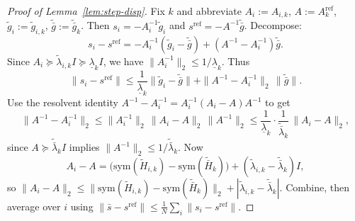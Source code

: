 \documentclass[10pt,twocolumn,letterpaper]{article}
\theoremstyle{compact}
\theoremstyle{compactremark}
\begin{document}
\begin{proof}[Proof of Lemma~\ref{lem:step-disp}]
Fix $k$ and abbreviate $A_i:=A_{i,k}$, $A:=A_k^{\mathrm{ref}}$, $\tilde g_i:=\tilde g_{i,k}$, $\tilde{\bar g}:=\tilde{\bar g}_k$.
Then $s_i=-A_i^{-1}\tilde g_i$ and $s^{\mathrm{ref}}=-A^{-1}\tilde{\bar g}$.
Decompose:
\[
s_i-s^{\mathrm{ref}}
=-A_i^{-1}(\tilde g_i-\tilde{\bar g}) + (A^{-1}-A_i^{-1})\tilde{\bar g}.
\]
Since $A_i\succeq \tilde\lambda_{i,k}I\succeq \underline\lambda_k I$, we have $\|A_i^{-1}\|_2\le 1/\underline\lambda_k$.
Thus
\[
\|s_i-s^{\mathrm{ref}}\|
\le \frac1{\underline\lambda_k}\|\tilde g_i-\tilde{\bar g}\|+\|A^{-1}-A_i^{-1}\|_2\,\|\tilde{\bar g}\|.
\]
Use the resolvent identity $A^{-1}-A_i^{-1}=A_i^{-1}(A_i-A)A^{-1}$ to get
\[
\|A^{-1}-A_i^{-1}\|_2\le \|A_i^{-1}\|_2\,\|A_i-A\|_2\,\|A^{-1}\|_2
\le \frac1{\underline\lambda_k}\cdot \frac1{\tilde{\bar\lambda}_k}\,\|A_i-A\|_2,
\]
since $A\succeq \tilde{\bar\lambda}_k I$ implies $\|A^{-1}\|_2\le 1/\tilde{\bar\lambda}_k$.
Now
\[
A_i-A=\big(\mathrm{sym}(\tilde H_{i,k})-\mathrm{sym}(\tilde{\bar H}_k)\big)+(\tilde\lambda_{i,k}-\tilde{\bar\lambda}_k)I,
\]
so $\|A_i-A\|_2\le \|\mathrm{sym}(\tilde H_{i,k})-\mathrm{sym}(\tilde{\bar H}_k)\|_2+|\tilde\lambda_{i,k}-\tilde{\bar\lambda}_k|$.
Combine, then average over $i$ using $\|\bar s-s^{\mathrm{ref}}\|\le \frac1N\sum_i\|s_i-s^{\mathrm{ref}}\|$.
\end{proof}
\end{document}
